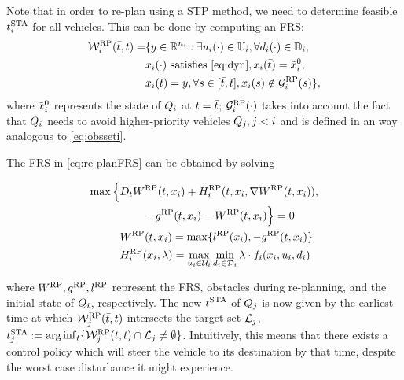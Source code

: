 Note that in order to re-plan using a STP method, we need to determine feasible $t^\text{STA}_i$ for all vehicles. This can be done by computing an FRS:
\begin{equation} \label{eq:re-planFRS}
\begin{aligned} 
\frs_i^{\text{RP}}(\tea, t) = & \{y \in \R^{n_i}: \exists \ctrl_i(\cdot) \in \cfset_i, \forall \dstb_i(\cdot) \in \dfset_i, \\
& \state_i(\cdot) \text{ satisfies \eqref{eq:dyn}}, \state_i(\tea) = \tilde{\state}_i^0, \\
& \state_i(t) = y, \forall s \in [\tea, t], \state_i(s) \notin \obsset_i^{\text{RP}}(s) \},
\end{aligned}
\end{equation}
\noindent where $\tilde{x}_i^0$ represents the state of $Q_i$ at $t = \bar{t}$; $\mathcal{G}_i^{\text{RP}}(\cdot)$ takes into account the fact that $Q_i$ needs to avoid higher-priority vehicles $Q_j, j<i$ and is defined in an way analogous to \eqref{eq:obsseti}.

The FRS in \eqref{eq:re-planFRS} can be obtained by solving %

\begin{equation}
\begin{aligned}
\max \Big\{&D_t W^{\text{RP}}(t, x_i) + H_i^{\text{RP}}(t, x_i, \nabla W^{\text{RP}}(t, x_i)), \\
&\qquad - g^{\text{RP}}(t, x_i) - W^{\text{RP}}(t, x_i) \Big\} = 0\\
&W^{\text{RP}}(\underline{t}, x_i) = \max\{l^{\text{RP}}(x_i), -g^{\text{RP}}(\underline{t}, x_i)\} \\
&H_i^{\text{RP}}(x_i, \lambda) = \max_{u_i \in \mathcal{U}_i} \min_{d_i \in \mathcal{D}_i} \lambda \cdot f_i (x_i, u_i, d_i)
\end{aligned}
\end{equation} 

\noindent where $W^{\text{RP}}, g^{\text{RP}}, l^{\text{RP}}$ represent the FRS, obstacles during re-planning, and the initial state of $Q_i$, respectively. The new $t^\text{STA}$ of $Q_j$ is now given by the earliest time at which $\mathcal{W}_j^{\text{RP}}(\bar{t}, t)$ intersects the target set $\mathcal{L}_j$, $t^\text{STA}_j := \arg \inf_t \{ \mathcal{W}_j^{\text{RP}}(\bar{t}, t) \cap \mathcal{L}_j \neq \emptyset \}$. Intuitively, this means that there exists a control policy which will steer the vehicle to its destination by that time, despite the worst case disturbance it might experience.

